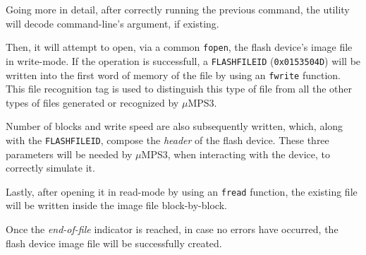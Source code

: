 \documentclass[12pt,a4paper,openright,twoside]{report}
\begin{document}
Going more in detail, after correctly running the previous command, the utility will decode command-line's argument, if existing.

Then, it will attempt to open, via a common \texttt{fopen}, the flash device's image file in write-mode.
If the operation is successfull, a \texttt{FLASHFILEID} (\texttt{0x0153504D}) will be written into the first word of memory of the file by using an \texttt{fwrite} function.
This file recognition tag is used to distinguish this type of file from all the other types of files generated or recognized by $\mu$MPS3.

Number of blocks and write speed are also subsequently written, which, along with the \texttt{FLASHFILEID}, compose the \textit{header} of the flash device.
These three parameters will be needed by $\mu$MPS3, when interacting with the device, to correctly simulate it.

Lastly, after opening it in read-mode by using an \texttt{fread} function, the existing file will be written inside the image file block-by-block.

Once the \textit{end-of-file} indicator is reached, in case no errors have occurred, the flash device image file will be successfully created.
\end{document}
